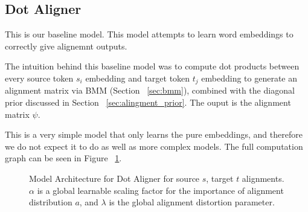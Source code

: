 \documentclass[twoside,twocolumn]{article}
\begin{document}
\subsection{Dot Aligner}
This is our baseline model. This model attempts to learn word embeddings
to correctly give alignemnt outputs.

The intuition behind this baseline model was to compute dot products
between every source token $s_i$ embedding and target token $t_j$ embedding
to generate an alignment matrix via BMM (Section ~\ref{sec:bmm}), combined
with the diagonal prior discussed in Section ~\ref{sec:alingment_prior}.
The ouput is the alignment matrix $\psi$.

This is a very simple model that only learns the pure embeddings, and
therefore we do not expect it to do as well as more complex models.
The full computation graph can be seen in Figure ~\ref{fig:dot_aligner}.

\begin{figure}
  \centering
  \caption{Model Architecture for Dot Aligner for source $s$,
  target $t$ alignments. $\alpha$ is a global learnable scaling factor for
  the importance of alignment distribution $a$, and $\lambda$ is the
  global alignment distortion parameter.}
  \label{fig:dot_aligner}
\end{figure}
\end{document}
